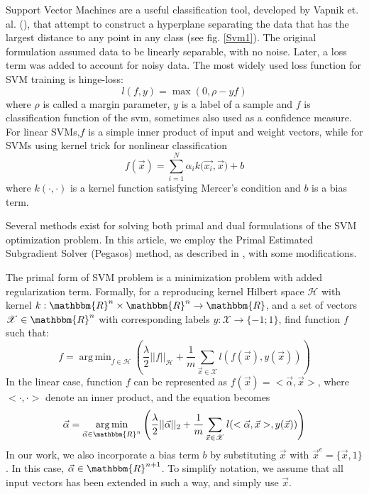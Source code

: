 \documentclass[10pt,twocolumn, a4paper]{article}
\DeclareMathOperator*{\argmin}{arg\,min}
\begin{document}
Support Vector Machines are a useful classification tool, developed by Vapnik et. al. (\cite{SVM}), that attempt to construct a hyperplane separating the data that has the largest distance to any point in any class (see fig. \ref{Svm1}). The original formulation assumed data to be linearly separable, with no noise. Later, a loss term was added to account for noisy data. The most widely used loss function for SVM training is hinge-loss:
\begin{equation}
\label{hinge}
l(f,y)=\max(0,\rho-yf)
\end{equation}
where $\rho$ is called a margin parameter, $y$ is a label of a sample and $f$ is classification function of the svm, sometimes also used as a confidence measure. For linear SVMs,$f$ is a simple inner product of input and weight vectors, while for SVMs using kernel trick for nonlinear classification
$$f(\vec{x})=\sum_{i=1}^{N}{\alpha_i k(\vec{x_i},\vec{x}})+b $$ where $k(\cdot,\cdot)$ is a kernel function satisfying Mercer's condition and $b$ is a bias term.

Several methods exist for solving both primal and dual formulations of the SVM optimization problem. In this article, we employ the Primal Estimated Subgradient Solver (Pegasos) method, as described in \cite{Pegasos}, with some modifications.

The primal form of SVM problem is a minimization problem with added regularization term.
Formally, for a reproducing kernel Hilbert space $\mathscr{H}$ with kernel $k:\mathbbm{R}^n\times\mathbbm{R}^n\rightarrow\mathbbm{R}$, and a set of vectors $\mathscr{X}\in\mathbbm{R}^n$  with corresponding labels $y:\mathscr{X} \rightarrow \{-1;1\}$, find function $f$ such that:
\begin{equation}
\label{Primal}
f=\argmin_{f\in\mathscr{H}}(\frac{\lambda}{2}||f||_\mathscr{H}+\frac{1}{m}\sum_{\vec{x}\in\mathscr{X}}{l(f(\vec{x}),y(\vec{x}))})
\end{equation} 
In the linear case, function $f$ can be represented as $f(\vec{x})=<\vec{\alpha},\vec{x}>$, where $<\cdot,\cdot>$ denote an inner product, and the equation becomes
\begin{equation}
\label{PrimalLinear}
\vec{\alpha}=\argmin_{\vec{\alpha}\in\mathbbm{R}^n}\left(\frac{\lambda}{2}||\vec{\alpha}||_2+\frac{1}{m}\sum_{\vec{x}\in\mathscr{X}}{l(<\vec{\alpha},\vec{x}>,y(\vec{x}))}\right)
\end{equation}
In our work, we also incorporate a bias term $b$ by substituting $\vec{x}$ with $\vec{x}^e=\{\vec{x},1\}$. In this case, $\vec{\alpha}\in \mathbbm{R}^{n+1}$. To simplify notation, we assume that all input vectors has been extended in such a way, and simply use $\vec{x}$.
\end{document}

